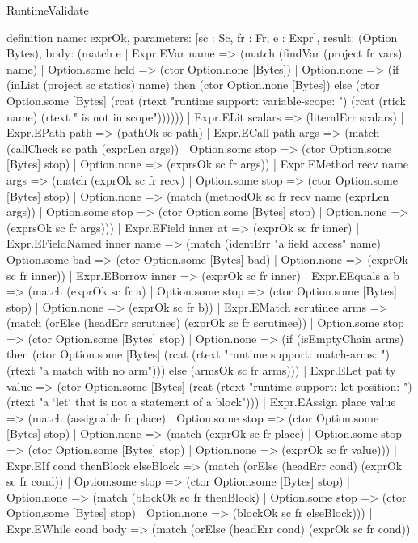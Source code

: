 \begin{lexlean}{RuntimeValidate}
\begin{semanticmodule}
definition{
  name: exprOk,
  parameters: [sc : Sc, fr : Fr, e : Expr],
  result: (Option Bytes),
  body: (match e
    | Expr.EVar name => (match (findVar (project fr vars) name)
      | Option.some held => (ctor Option.none [Bytes])
      | Option.none => (if (inList (project sc statics) name) then (ctor Option.none [Bytes]) else (ctor Option.some [Bytes] (rcat (rtext "runtime support: variable-scope: ") (rcat (rtick name) (rtext " is not in scope"))))))
    | Expr.ELit scalars => (literalErr scalars)
    | Expr.EPath path => (pathOk sc path)
    | Expr.ECall path args => (match (callCheck sc path (exprLen args))
      | Option.some stop => (ctor Option.some [Bytes] stop)
      | Option.none => (exprsOk sc fr args))
    | Expr.EMethod recv name args => (match (exprOk sc fr recv)
      | Option.some stop => (ctor Option.some [Bytes] stop)
      | Option.none => (match (methodOk sc fr recv name (exprLen args))
        | Option.some stop => (ctor Option.some [Bytes] stop)
        | Option.none => (exprsOk sc fr args)))
    | Expr.EField inner at => (exprOk sc fr inner)
    | Expr.EFieldNamed inner name => (match (identErr "a field access" name)
      | Option.some bad => (ctor Option.some [Bytes] bad)
      | Option.none => (exprOk sc fr inner))
    | Expr.EBorrow inner => (exprOk sc fr inner)
    | Expr.EEquals a b => (match (exprOk sc fr a)
      | Option.some stop => (ctor Option.some [Bytes] stop)
      | Option.none => (exprOk sc fr b))
    | Expr.EMatch scrutinee arms => (match (orElse (headErr scrutinee) (exprOk sc fr scrutinee))
      | Option.some stop => (ctor Option.some [Bytes] stop)
      | Option.none => (if (isEmptyChain arms) then (ctor Option.some [Bytes] (rcat (rtext "runtime support: match-arms: ") (rtext "a match with no arm"))) else (armsOk sc fr arms)))
    | Expr.ELet pat ty value => (ctor Option.some [Bytes] (rcat (rtext "runtime support: let-position: ") (rtext "a `let` that is not a statement of a block")))
    | Expr.EAssign place value => (match (assignable fr place)
      | Option.some stop => (ctor Option.some [Bytes] stop)
      | Option.none => (match (exprOk sc fr place)
        | Option.some stop => (ctor Option.some [Bytes] stop)
        | Option.none => (exprOk sc fr value)))
    | Expr.EIf cond thenBlock elseBlock => (match (orElse (headErr cond) (exprOk sc fr cond))
      | Option.some stop => (ctor Option.some [Bytes] stop)
      | Option.none => (match (blockOk sc fr thenBlock)
        | Option.some stop => (ctor Option.some [Bytes] stop)
        | Option.none => (blockOk sc fr elseBlock)))
    | Expr.EWhile cond body => (match (orElse (headErr cond) (exprOk sc fr cond))
}
\end{semanticmodule}
\end{lexlean}

